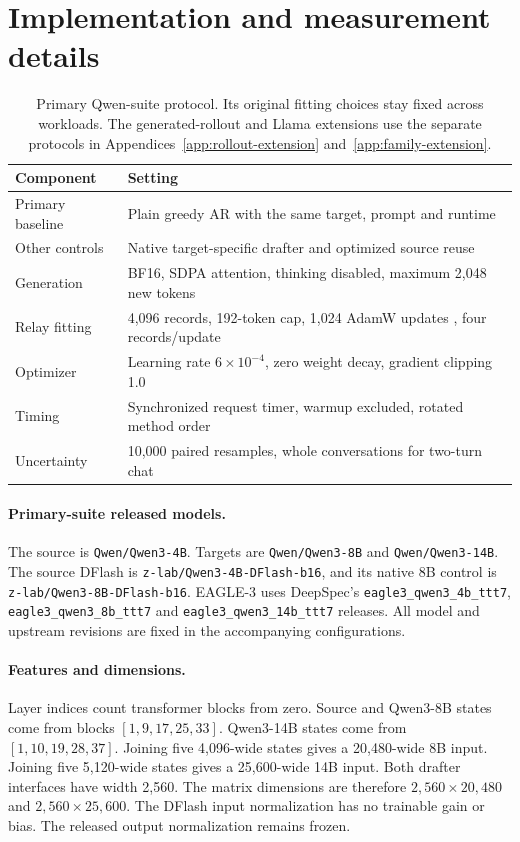 \documentclass{article}
\begin{document}
\section{Implementation and measurement details}
\label{app:protocol}

\begin{table}[H]
\caption{Primary Qwen-suite protocol. Its original fitting choices stay fixed
across workloads. The generated-rollout and Llama extensions use the separate
protocols in Appendices~\ref{app:rollout-extension} and~\ref{app:family-extension}.}
\label{tab:setup}
\centering\small
\begin{tabular}{p{.23\linewidth}p{.70\linewidth}}
\toprule
Component & Setting \\
\midrule
Primary baseline & Plain greedy AR with the same target, prompt and runtime \\
Other controls & Native target-specific drafter and optimized source reuse \\
Generation & BF16, SDPA attention, thinking disabled, maximum 2,048 new tokens \\
Relay fitting & 4,096 records, 192-token cap, 1,024 AdamW updates \citep{loshchilov2019adamw}, four records/update \\
Optimizer & Learning rate $6\times10^{-4}$, zero weight decay, gradient clipping 1.0 \\
Timing & Synchronized request timer, warmup excluded, rotated method order \\
Uncertainty & 10,000 paired resamples, whole conversations for two-turn chat \\
\bottomrule
\end{tabular}
\end{table}

\paragraph{Primary-suite released models.}
The source is \texttt{Qwen/Qwen3-4B}. Targets are
\texttt{Qwen/Qwen3-8B} and \texttt{Qwen/Qwen3-14B}.
The source DFlash is \texttt{z-lab/Qwen3-4B-DFlash-b16}, and its native
8B control is \texttt{z-lab/Qwen3-8B-DFlash-b16}. EAGLE-3 uses DeepSpec's
\texttt{eagle3\_qwen3\_4b\_ttt7}, \texttt{eagle3\_qwen3\_8b\_ttt7}
and \texttt{eagle3\_qwen3\_14b\_ttt7} releases. All model and upstream
revisions are fixed in the accompanying configurations.

\paragraph{Features and dimensions.}
Layer indices count transformer blocks from zero. Source and Qwen3-8B
states come from blocks $[1,9,17,25,33]$. Qwen3-14B states come from
$[1,10,19,28,37]$. Joining five 4,096-wide states gives a 20,480-wide
8B input. Joining five 5,120-wide states gives a 25,600-wide 14B input.
Both drafter interfaces have width 2,560. The matrix dimensions are
therefore $2,560\times20,480$ and $2,560\times25,600$.
The DFlash input normalization has no trainable gain or bias. The
released output normalization remains frozen.
\end{document}

